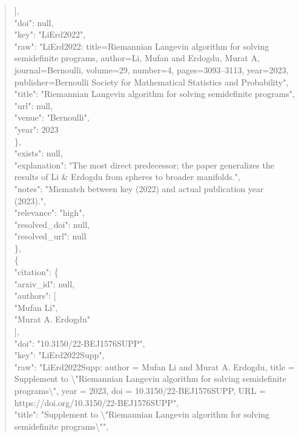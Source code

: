 \documentclass[11pt]{article}
\begin{document}
\begin{quote}
        ],\\
        "doi": null,\\
        "key": "LiErd2022",\\
        "raw": "LiErd2022: title=Riemannian Langevin algorithm for solving semidefinite programs, author=Li, Mufan and Erdogdu, Murat A, journal=Bernoulli, volume=29, number=4, pages=3093--3113, year=2023, publisher=Bernoulli Society for Mathematical Statistics and Probability",\\
        "title": "Riemannian Langevin algorithm for solving semidefinite programs",\\
        "url": null,\\
        "venue": "Bernoulli",\\
        "year": 2023\\
      \},\\
      "exists": null,\\
      "explanation": "The most direct predecessor; the paper generalizes the results of Li \& Erdogdu from spheres to broader manifolds.",\\
      "notes": "Mismatch between key (2022) and actual publication year (2023).",\\
      "relevance": "high",\\
      "resolved\_doi": null,\\
      "resolved\_url": null\\
    \},\\
    \{\\
      "citation": \{\\
        "arxiv\_id": null,\\
        "authors": [\\
          "Mufan Li",\\
          "Murat A. Erdogdu"\\
        ],\\
        "doi": "10.3150/22-BEJ1576SUPP",\\
        "key": "LiErd2022Supp",\\
        "raw": "LiErd2022Supp: author = Mufan Li and Murat A. Erdogdu, title = Supplement to \textbackslash{}"Riemannian Langevin algorithm for solving semidefinite programs\textbackslash{}", year = 2023, doi = 10.3150/22-BEJ1576SUPP, URL = https://doi.org/10.3150/22-BEJ1576SUPP",\\
        "title": "Supplement to \textbackslash{}"Riemannian Langevin algorithm for solving semidefinite programs\textbackslash{}"",\\

\end{quote}
\end{document}
